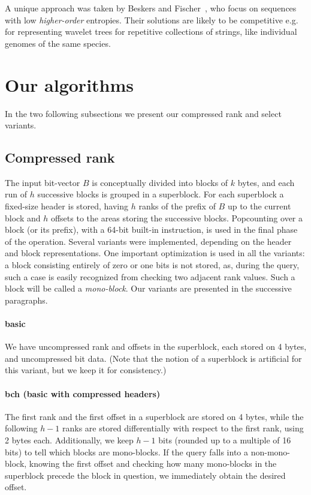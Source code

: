 \documentclass{llncs}
\begin{document}
A unique approach was taken by Beskers and Fischer~\cite{BF14}, 
who focus on sequences with low {\em higher-order} entropies. 
Their solutions are likely to be competitive e.g. 
for representing wavelet trees for repetitive collections of
strings, like individual genomes of the same species.



\section{Our algorithms}

In the two following subsections we present our compressed rank and select 
variants.

\subsection{Compressed rank}
\label{sec:crank}
The input bit-vector $B$ is conceptually divided into blocks of $k$ bytes, 
and each run of $h$ successive blocks is grouped in a superblock.
For each superblock a fixed-size header is stored, having $h$ ranks of the 
prefix of $B$ up to the current block and $h$ offsets to the areas storing the 
successive blocks.
Popcounting over a block (or its prefix), with a 64-bit built-in instruction, 
is used in the final phase of the operation.
Several variants were implemented, depending on the header and 
block representations.
One important optimization is used in all the variants:
a block consisting entirely of zero or one bits is not stored, as, 
during the query, such a case is easily recognized from checking 
two adjacent rank values.
Such a block will be called a {\em mono-block}.
Our variants are presented in the successive paragraphs.

\paragraph*{\textbf{basic}}
We have uncompressed rank and offsets in the superblock, 
each stored on 4 bytes, and uncompressed bit data.
(Note that the notion of a superblock is artificial for this variant, 
but we keep it for consistency.)


\paragraph*{\textbf{bch (basic with compressed headers)}}
The first rank and the first offset in a superblock are stored on 4 bytes, 
while the following $h-1$ ranks are stored differentially 
with respect to the first rank, using 2 bytes each.
Additionally, we keep $h-1$ bits (rounded up to a multiple of 16 bits) 
to tell which blocks are mono-blocks.
If the query falls into a non-mono-block, knowing the first offset and 
checking how many mono-blocks in the superblock precede the block in question, 
we immediately obtain the desired offset.
\end{document}
